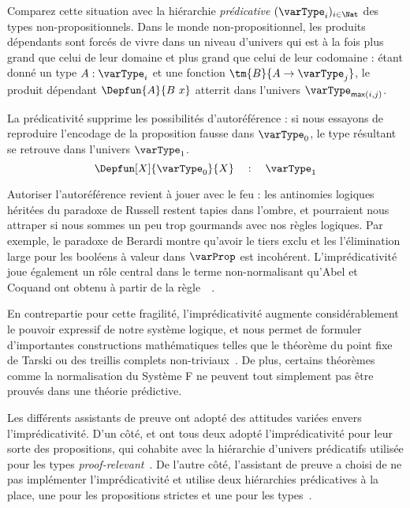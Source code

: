 Comparez cette situation avec la hiérarchie \emph{prédicative} 
$(\varType_i)_{i \in \Nat}$ 
% 
% 
des types non-propositionnels.
% 
Dans le monde non-propositionnel, les produits dépendants sont forcés de vivre 
dans un niveau d'univers qui est à la fois plus grand que celui de leur domaine et
plus grand que celui de leur codomaine :
% 
étant donné un type \( A : \varType_i \) et une fonction \( {\tm{B}{A \to \varType_j}} \), 
le produit dépendant \( \Depfun{A}{B\ x} \) atterrit dans l'univers
\( \varType_{\mathsf{max}(i,j)} \).
 
La prédicativité supprime les possibilités d'autoréférence : si nous essayons 
de reproduire l'encodage de la proposition fausse dans \( \varType_0 \), le 
type résultant se retrouve dans l'univers \( \varType_1 \).
\[
\Depfun[X]{\varType_0}{X} \quad : \quad \varType_1
\]

Autoriser l'autoréférence revient à jouer avec le feu : les antinomies 
logiques héritées du paradoxe de Russell restent tapies dans l'ombre, et 
pourraient nous attraper si nous sommes un peu trop gourmands avec nos 
règles logiques.
% 
Par exemple, le paradoxe de Berardi montre qu'avoir le tiers exclu et les 
l'élimination large pour les booléens à valeur dans \( \varProp \) est incohérent. 
% 
L'imprédicativité joue également un rôle central dans le terme 
non-normalisant qu'Abel et Coquand ont obtenu à partir de la 
règle~~.

En contrepartie pour cette fragilité, l'imprédicativité augmente considérablement 
le pouvoir expressif de notre système logique, et nous permet de formuler 
d'importantes constructions mathématiques telles que le théorème du point fixe 
de Tarski ou des treillis complets non-triviaux~. 
% 
De plus, certains théorèmes comme la normalisation du Système F ne peuvent tout
simplement pas être prouvés dans une théorie prédictive.

Les différents assistants de preuve ont adopté des attitudes variées envers 
l'imprédicativité. D'un côté, 
% 
% 
\Coq et \Lean ont tous deux adopté l'imprédicativité pour leur sorte des 
propositions, qui cohabite avec la hiérarchie d'univers prédicatifs utilisée 
pour les types \emph{proof-relevant}~.
% 
De l'autre côté, l'assistant de preuve \Agda a choisi de ne pas implémenter
l'imprédicativité et utilise deux hiérarchies prédicatives à la place, une 
pour les propositions strictes et une pour les types~.

